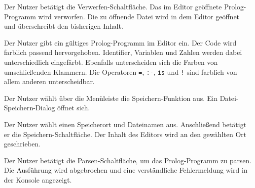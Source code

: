 \documentclass[parskip=full,11pt,twoside]{scrartcl}
\begin{document}
{Der Nutzer betätigt die Verwerfen-Schaltfläche.}
{Das im Editor geöffnete Prolog-Programm wird verworfen. Die zu öffnende Datei wird in dem Editor geöffnet und überschreibt den bisherigen Inhalt.}



{Der Nutzer gibt ein gültiges Prolog-Programm im Editor ein.}
{Der Code wird farblich passend hervorgehoben. Identifier, Variablen und Zahlen werden dabei unterschiedlich eingefärbt. Ebenfalls unterscheiden sich die Farben von umschließenden Klammern. Die Operatoren \texttt{=}, \texttt{:-}, \texttt{is} und \texttt{!} sind farblich von allem anderen unterscheidbar.}



{Der Nutzer wählt über die Menüleiste die Speichern-Funktion aus.}
{Ein Datei-Speichern-Dialog öffnet sich.}

{Der Nutzer wählt einen Speicherort und Dateinamen aus. Anschließend betätigt er die Speichern-Schaltfläche.}
{Der Inhalt des Editors wird an den gewählten Ort geschrieben.}



{Der Nutzer betätigt die Parsen-Schaltfläche, um das Prolog-Programm zu parsen.}
{Die Ausführung wird abgebrochen und eine verständliche Fehlermeldung wird in der Konsole angezeigt.}


\end{document}
